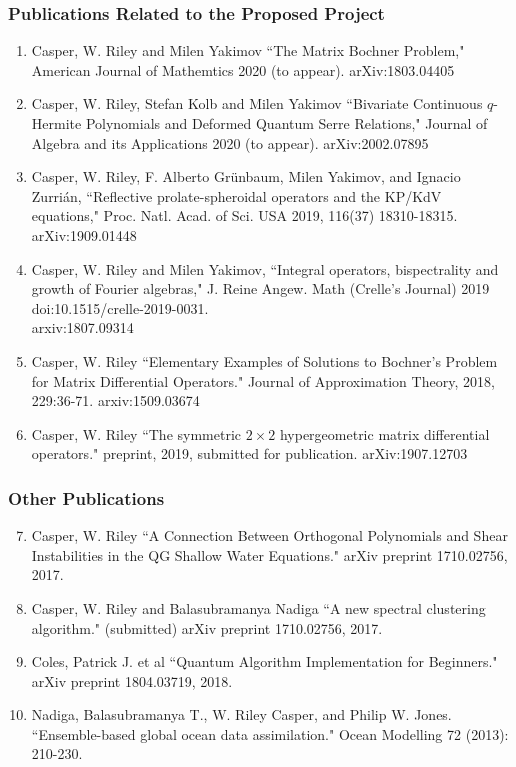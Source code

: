 \documentclass[11pt,letterpaper]{article}
\theoremstyle{definition}
\begin{document}
\subsubsection*{Publications Related to the Proposed Project}
\begin{enumerate}
\item  Casper, W. Riley and Milen Yakimov ``The Matrix Bochner Problem," American Journal of Mathemtics 2020 (to appear).  arXiv:1803.04405
\item  Casper, W. Riley, Stefan Kolb and Milen Yakimov ``Bivariate Continuous $q$-Hermite Polynomials and Deformed Quantum Serre Relations," Journal of Algebra and its Applications 2020 (to appear).  arXiv:2002.07895
\item  Casper, W. Riley, F. Alberto Gr\"unbaum, Milen Yakimov, and Ignacio Zurri\'an, ``Reflective prolate-spheroidal operators and the KP/KdV equations," Proc. Natl. Acad. of Sci. USA 2019, 116(37) 18310-18315. arXiv:1909.01448
\item  Casper, W. Riley and Milen Yakimov, ``Integral operators, bispectrality and growth of Fourier algebras," J. Reine Angew. Math (Crelle's Journal) 2019 doi:10.1515/crelle-2019-0031.\\arxiv:1807.09314
\item  Casper, W. Riley ``Elementary Examples of Solutions to Bochner's Problem for Matrix Differential Operators." Journal of Approximation Theory, 2018, 229:36-71.  arxiv:1509.03674
\item  Casper, W. Riley ``The symmetric $2\times 2$ hypergeometric matrix differential operators." preprint, 2019, submitted for publication.  arXiv:1907.12703
\end{enumerate}
\subsubsection*{Other Publications}
\begin{enumerate}
\setcounter{enumi}{6}
\item  Casper, W. Riley ``A Connection Between Orthogonal Polynomials and Shear Instabilities in the QG Shallow Water Equations." arXiv preprint 1710.02756, 2017.
\item  Casper, W. Riley and Balasubramanya Nadiga ``A new spectral clustering algorithm." (submitted) arXiv preprint 1710.02756, 2017.
\item  Coles, Patrick J. et al ``Quantum Algorithm Implementation for Beginners." arXiv preprint 1804.03719, 2018.
\item  Nadiga, Balasubramanya T., W. Riley Casper, and Philip W. Jones. ``Ensemble-based global ocean data assimilation." Ocean Modelling 72 (2013): 210-230.
\end{enumerate}
\end{document}
